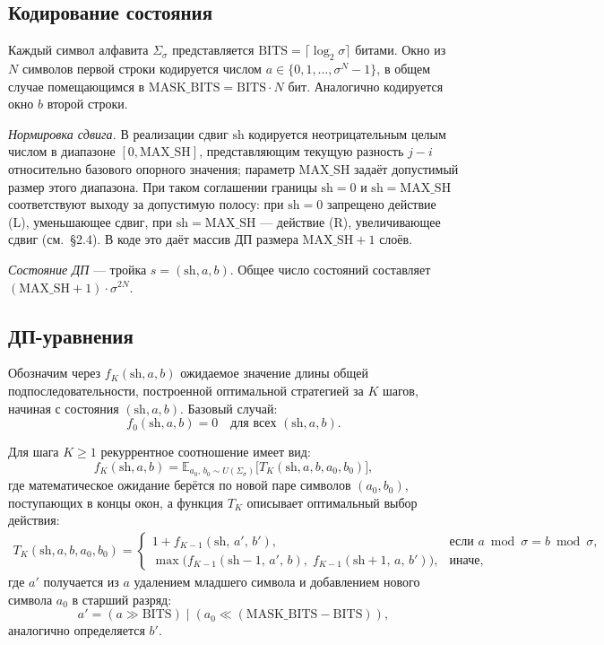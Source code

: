 \subsection{Кодирование состояния}

Каждый символ алфавита $\Sigma_\sigma$ представляется $\mathrm{BITS} = \lceil \log_2 \sigma \rceil$ битами. Окно из $N$ символов первой строки кодируется числом $a \in \{0, 1, \ldots, \sigma^N - 1\}$, в общем случае помещающимся в $\mathrm{MASK\_BITS} = \mathrm{BITS} \cdot N$ бит. Аналогично кодируется окно $b$ второй строки.

\emph{Нормировка сдвига.} В реализации сдвиг $\mathrm{sh}$ кодируется неотрицательным целым числом в диапазоне $[0, \mathrm{MAX\_SH}]$, представляющим текущую разность $j - i$ относительно базового опорного значения; параметр $\mathrm{MAX\_SH}$ задаёт допустимый размер этого диапазона. При таком соглашении границы $\mathrm{sh} = 0$ и $\mathrm{sh} = \mathrm{MAX\_SH}$ соответствуют выходу за допустимую полосу: при $\mathrm{sh} = 0$ запрещено действие (L), уменьшающее сдвиг, при $\mathrm{sh} = \mathrm{MAX\_SH}$ --- действие (R), увеличивающее сдвиг (см.~\S2.4). В коде это даёт массив ДП размера $\mathrm{MAX\_SH}+1$ слоёв.

\emph{Состояние ДП} --- тройка $s = (\mathrm{sh}, a, b)$. Общее число состояний составляет $(\mathrm{MAX\_SH}+1) \cdot \sigma^{2N}$.

\subsection{ДП-уравнения}

Обозначим через $f_K(\mathrm{sh}, a, b)$ ожидаемое значение длины общей подпоследовательности, построенной оптимальной стратегией за $K$ шагов, начиная с состояния $(\mathrm{sh}, a, b)$. Базовый случай:
\[
    f_0(\mathrm{sh}, a, b) = 0 \quad \text{для всех } (\mathrm{sh}, a, b).
\]

Для шага $K \geq 1$ рекуррентное соотношение имеет вид:
\[
    f_K(\mathrm{sh}, a, b) = \mathbb{E}_{a_0,\, b_0 \sim U(\Sigma_\sigma)}\bigl[ T_K(\mathrm{sh}, a, b, a_0, b_0) \bigr],
\]
где математическое ожидание берётся по новой паре символов $(a_0, b_0)$, поступающих в концы окон, а функция $T_K$ описывает оптимальный выбор действия:
\begin{align*}
T_K(\mathrm{sh}, a, b, a_0, b_0) =
\begin{cases}
1 + f_{K-1}(\mathrm{sh},\, a',\, b'),
    & \text{если } a \bmod \sigma = b \bmod \sigma, \\[2pt]
\max\bigl(f_{K-1}(\mathrm{sh}-1,\, a',\, b),\;
         f_{K-1}(\mathrm{sh}+1,\, a,\, b')\bigr),
    & \text{иначе,}
\end{cases}
\end{align*}
где $a'$ получается из $a$ удалением младшего символа и добавлением нового символа $a_0$ в старший разряд:
\[
    a' = (a \gg \mathrm{BITS}) \;|\; (a_0 \ll (\mathrm{MASK\_BITS} - \mathrm{BITS})),
\]
аналогично определяется $b'$.

